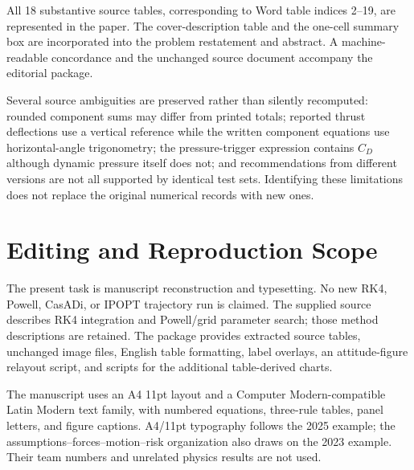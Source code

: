 \documentclass[11pt,a4paper]{article}
\begin{document}
All 18 substantive source tables, corresponding to Word table indices 2--19, are represented in the paper. The cover-description table and the one-cell summary box are incorporated into the problem restatement and abstract. A machine-readable concordance and the unchanged source document accompany the editorial package.

Several source ambiguities are preserved rather than silently recomputed: rounded component sums may differ from printed totals; reported thrust deflections use a vertical reference while the written component equations use horizontal-angle trigonometry; the pressure-trigger expression contains $C_D$ although dynamic pressure itself does not; and recommendations from different versions are not all supported by identical test sets. Identifying these limitations does not replace the original numerical records with new ones.

\section{Editing and Reproduction Scope}
The present task is manuscript reconstruction and typesetting. No new RK4, Powell, CasADi, or IPOPT trajectory run is claimed. The supplied source describes RK4 integration and Powell/grid parameter search; those method descriptions are retained. The package provides extracted source tables, unchanged image files, English table formatting, label overlays, an attitude-figure relayout script, and scripts for the additional table-derived charts.

The manuscript uses an A4 11pt layout and a Computer Modern-compatible Latin Modern text family, with numbered equations, three-rule tables, panel letters, and figure captions. A4/11pt typography follows the 2025 example; the assumptions--forces--motion--risk organization also draws on the 2023 example. Their team numbers and unrelated physics results are not used.
\end{document}
